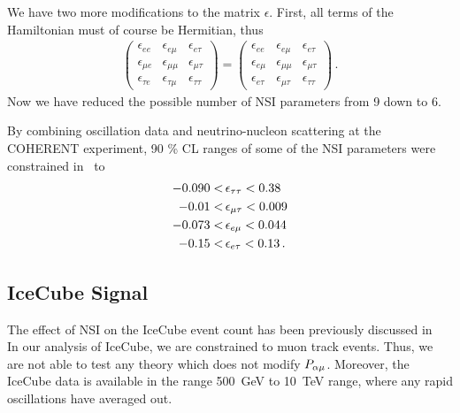 We have two more modifications to the matrix $\epsilon$. First, all terms of the Hamiltonian must of course be Hermitian, thus
\begin{align}
    \begin{pmatrix}
        \epsilon_{ee} & \epsilon_{e\mu} & \epsilon_{e\tau}  \\
        \epsilon_{\mu e} & \epsilon_{\mu\mu} & \epsilon_{\mu\tau}  \\
        \epsilon_{\tau e} & \epsilon_{\tau\mu} & \epsilon_{\tau\tau}
    \end{pmatrix} =
    \begin{pmatrix}
        \epsilon_{ee} & \epsilon_{e\mu} & \epsilon_{e\tau}  \\
        \epsilon_{e \mu} & \epsilon_{\mu\mu} & \epsilon_{\mu\tau}  \\
        \epsilon_{e\tau} & \epsilon_{\mu\tau} & \epsilon_{\tau\tau}
    \end{pmatrix}\,.
\end{align}
Now we have reduced the possible number of NSI parameters from 9 down to 6. 

By combining oscillation data and neutrino-nucleon scattering at the COHERENT experiment, 90 \% CL ranges of some of 
the NSI parameters were constrained in~\cite{coherent} to
\begin{align}\label{eq:coherentbounds}
    -0.090 < &\,\epsilon_{\tau\tau} < 0.38 \nonumber \\
    -0.01 < &\,\epsilon_{\mu\tau} < 0.009 \nonumber \\
    -0.073 < &\,\epsilon_{e\mu} < 0.044 \nonumber \\
    -0.15 < &\,\epsilon_{e\tau} < 0.13\,.
\end{align}


\subsection{IceCube Signal}
The effect of NSI on the IceCube event count has been previously discussed in~\cite{salvadoNSI, DC2021, nsiFarzan}
In our analysis of IceCube, we are constrained to muon track events. Thus, we are not able to test any theory which does not modify $P_{\alpha \mu}$. Moreover,
the IceCube data is available in the range \SI{500}{\GeV} to \SI{10}{\TeV} range, where any rapid oscillations have averaged out.

